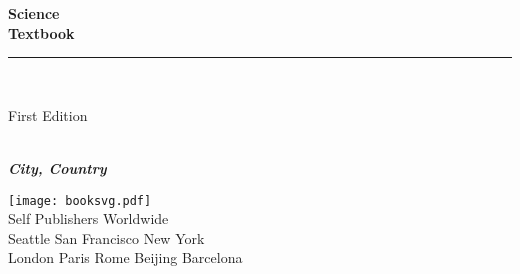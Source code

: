 \documentclass{book}
\makeatletter
\newcommand{\booksubtitle}{A Latex Template for a Science Textbook}
\newcommand{\authorsubtitle}{City, Country}
\newcommand{\bookauthor}{\@author}
\makeatother
\begin{document}
\begin{titlepage}
    \begin{flushleft}

        \textbf{\fontsize{48}{54}\selectfont Science\\Textbook\\}

        \par\noindent\rule{\textwidth}{4pt}\\


        \begin{flushright}
            \Large First Edition
        \end{flushright}

        \vspace{\fill}

        \textbf{\large \bookauthor}\\[3.5pt]
        \textbf{\large \textit{\authorsubtitle}}

        \vspace{\fill}

        \begin{center}
            \texttt{[image: booksvg.pdf]}\\[4pt]
            \small{Self Publishers Worldwide\\
                Seattle San Francisco New York\\
                London Paris Rome Beijing Barcelona}
        \end{center}

    \end{flushleft}
\end{titlepage}
\restoregeometry
\end{document}

